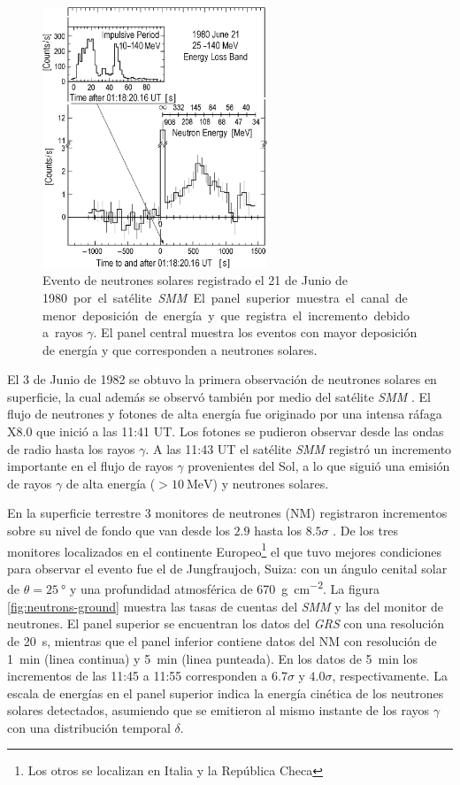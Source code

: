 \begin{figure}
        \centering
        \includegraphics[width=0.6\textwidth]{solar-neutrons.png}
        \caption{Evento de neutrones solares registrado el \num{21} de Junio de \SI{1980} por el satélite \emph{SMM}. El panel superior muestra el canal de menor deposición de energía y que registra el incremento debido a rayos $\gamma$. El panel central muestra los eventos con mayor deposición de energía y que corresponden a neutrones solares.}
        \label{fig:solar-neutrons}
\end{figure}

El \num{3} de Junio de \num{1982} se obtuvo la primera observación de neutrones solares en superficie, la cual además se observó también por medio del satélite \emph{SMM} \cite{debrunner83}. El flujo de neutrones y fotones de alta energía fue originado por una intensa ráfaga X8.0 que inició a las 11:41 UT. Los fotones se pudieron observar desde las ondas de radio hasta los rayos $\gamma$. A las 11:43 UT el satélite \emph{SMM} registró un incremento importante en el flujo de rayos $\gamma$ provenientes del Sol, a lo que siguió una emisión de rayos $\gamma$ de alta energía ($>\SI{10}{\mega\electronvolt}$) y neutrones solares.

En la superficie terrestre \num{3} monitores de neutrones (NM) registraron incrementos sobre su nivel de fondo que van desde los $2.9$ hasta los $8.5\sigma$ \cite{chupp87}. De los tres monitores localizados en el continente Europeo\footnote{Los otros se localizan en Italia y la República Checa} el que tuvo mejores condiciones para observar el evento fue el de  Jungfraujoch, Suiza: con un ángulo cenital solar de $\theta=\SI{25}{\degree}$ y una profundidad atmosférica de \SI{670}{\gram\per\square\cm}. La figura \ref{fig:neutrons-ground} muestra las tasas de cuentas del \emph{SMM} y las del monitor de neutrones. El panel superior se encuentran los datos del \emph{GRS} con una resolución de \SI{20}{\second}, mientras que el panel inferior contiene datos del NM con resolución de \SI{1}{\minute} (linea continua) y \SI{5}{\minute} (linea punteada). En los datos de \SI{5}{\minute} los incrementos de las 11:45 a 11:55 corresponden a $6.7\sigma$ y $4.0\sigma$, respectivamente. La escala de energías en el panel superior indica la energía cinética de los neutrones solares detectados, asumiendo que se emitieron al mismo instante de los rayos $\gamma$ con una distribución temporal $\delta$.

